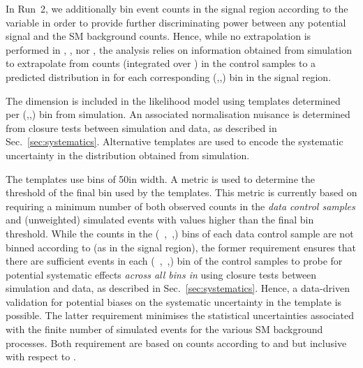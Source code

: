 In Run~2, we additionally bin event counts in the signal region according to the variable \mht in order to provide further
discriminating power between any potential signal and the SM background counts. Hence, while no extrapolation is performed in
\njet, \nb, nor \HT, the analysis relies on information obtained from simulation to extrapolate from counts (integrated over \mht) in
the control samples to a predicted distribution in \mht for each corresponding (\njet,\nb,\HT) bin in the signal region.

The \mht dimension is included in the likelihood model using templates determined per (\njet,\nb,\HT) bin from simulation. An associated
normalisation nuisance is determined from closure tests between simulation and data, as described in
Sec.~\ref{sec:systematics}. Alternative templates are used to encode the systematic uncertainty in the \mht distribution obtained from
simulation. 

The templates use \mht bins of 50\gev in width. A metric is used to determine the threshold of the final \mht bin used by the
templates. This metric is currently based on requiring a minimum number of both observed counts in the {\it data control samples} and
(unweighted) simulated events with \mht values higher than the final bin threshold. While the counts in the (\njet~,\nb~,\HT) bins of each
data control sample are not binned according to \mht (as in the signal region), the former requirement ensures that there are
sufficient events in each (\njet~,\nb~,\HT) bin of the control samples to probe for potential systematic effects {\it across all bins in
  \mht} using closure tests between simulation and data, as described in Sec.~\ref{sec:systematics}. Hence, a data-driven validation for
potential biases on the systematic uncertainty in the \mht template is possible. The latter requirement minimises the statistical
uncertainties associated with the finite number of simulated events for the various SM background processes. Both requirement are based on
counts according to \njet and \nb but inclusive with respect to \nb.
